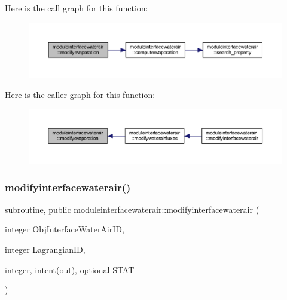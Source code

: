 Here is the call graph for this function\+:\nopagebreak
\begin{figure}[H]
\begin{center}
\leavevmode
\includegraphics[width=350pt]{namespacemoduleinterfacewaterair_a0c61f58f27a4d911118aadbccbbd1920_cgraph}
\end{center}
\end{figure}
Here is the caller graph for this function\+:\nopagebreak
\begin{figure}[H]
\begin{center}
\leavevmode
\includegraphics[width=350pt]{namespacemoduleinterfacewaterair_a0c61f58f27a4d911118aadbccbbd1920_icgraph}
\end{center}
\end{figure}
\mbox{\label{namespacemoduleinterfacewaterair_ad372fa1a038ce383360d4422cc25923d}} 
\subsubsection{\texorpdfstring{modifyinterfacewaterair()}{modifyinterfacewaterair()}}
{\footnotesize\ttfamily subroutine, public moduleinterfacewaterair\+::modifyinterfacewaterair (\begin{DoxyParamCaption}\item[{integer}]{Obj\+Interface\+Water\+Air\+ID,  }\item[{integer}]{Lagrangian\+ID,  }\item[{integer, intent(out), optional}]{S\+T\+AT }\end{DoxyParamCaption})}

